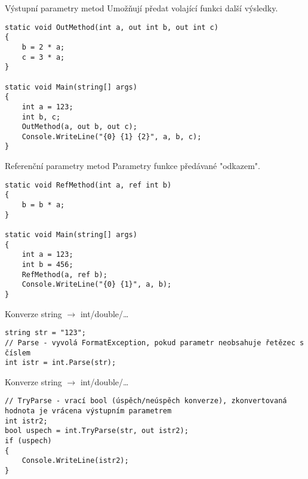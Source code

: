 \begin{frame}[fragile]
\begin{block}{Výstupní parametry metod}
Umožňují předat volající funkci další výsledky.
\end{block}

\begin{yesblock}
\begin{lstlisting}
static void OutMethod(int a, out int b, out int c)
{
    b = 2 * a;
    c = 3 * a;
}

static void Main(string[] args)
{
    int a = 123;
    int b, c;
    OutMethod(a, out b, out c);
    Console.WriteLine("{0} {1} {2}", a, b, c);
}
\end{lstlisting}
\end{yesblock}
\end{frame}


\begin{frame}[fragile]
\begin{block}{Referenční parametry metod}
Parametry funkce předávané "odkazem".
\end{block}

\begin{yesblock}
\begin{lstlisting}
static void RefMethod(int a, ref int b)
{
    b = b * a;
}

static void Main(string[] args)
{
    int a = 123;
    int b = 456;
    RefMethod(a, ref b);
    Console.WriteLine("{0} {1}", a, b);
}
\end{lstlisting}
\end{yesblock}
\end{frame}



\begin{frame}[fragile]
\begin{exampleblock}{Konverze string $\rightarrow$ int/double/\ldots}
\begin{lstlisting}
string str = "123";
// Parse - vyvolá FormatException, pokud parametr neobsahuje řetězec s číslem
int istr = int.Parse(str);
\end{lstlisting}
\end{exampleblock}

\begin{exampleblock}{Konverze string $\rightarrow$ int/double/\ldots}
\begin{lstlisting}
// TryParse - vrací bool (úspěch/neúspěch konverze), zkonvertovaná hodnota je vrácena výstupním parametrem
int istr2;
bool uspech = int.TryParse(str, out istr2);
if (uspech) 
{
    Console.WriteLine(istr2);
}

\end{lstlisting}
\end{exampleblock}
\end{frame}


